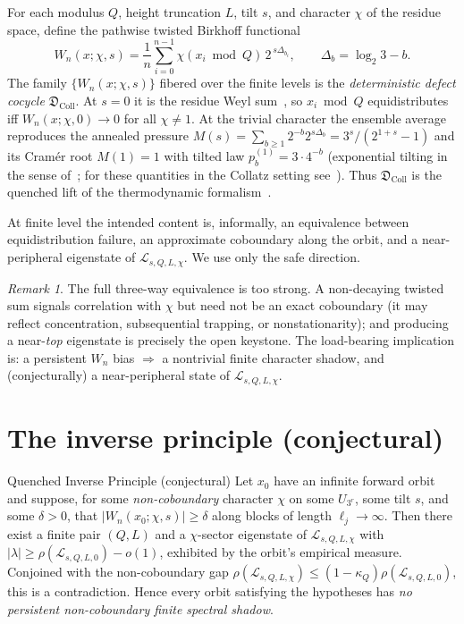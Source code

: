 \documentclass[11pt]{article}
\newcommand{\Lcal}{\mathcal{L}}
\newcommand{\UQ}{U_{3^r}}
\newcommand{\Dcoll}{\mathfrak{D}_{\mathrm{Coll}}}
\theoremstyle{plain}
\theoremstyle{definition}
\theoremstyle{remark}
\newtheorem*{remark}{Remark}
\begin{document}
For each modulus $Q$, height truncation $L$, tilt $s$, and character $\chi$ of
the residue space, define the pathwise twisted Birkhoff functional
\[
W_n(x;\chi,s)=\frac1n\sum_{i=0}^{n-1}\chi(x_i\bmod Q)\,2^{\,s\Delta_{b_i}},
\qquad \Delta_b=\log_2 3-b .
\]
The family $\{W_n(x;\chi,s)\}$ fibered over the finite levels is the
\emph{deterministic defect cocycle} $\Dcoll$. At $s=0$ it is the residue Weyl
sum~\cite{weyl1916}, so $x_i\bmod Q$ equidistributes iff $W_n(x;\chi,0)\to0$ for all $\chi\ne1$.
At the trivial character the ensemble average reproduces the annealed pressure
$M(s)=\sum_{b\ge1}2^{-b}2^{s\Delta_b}=3^s/(2^{1+s}-1)$ and its Cram\'er root
$M(1)=1$ with tilted law $p^{(1)}_b=3\cdot4^{-b}$
(exponential tilting in the sense of~\cite{cramer1938,dembozeitouni}; for these
quantities in the Collatz setting see~\cite{kontorovichlagarias,tao2022}). Thus $\Dcoll$ is the quenched
lift of the thermodynamic formalism~\cite{ruelle2004,baladi2000}.

At finite level the intended content is, informally, an equivalence between
equidistribution failure, an approximate coboundary along the orbit, and a
near-peripheral eigenstate of $\Lcal_{s,Q,L,\chi}$. We use only the safe
direction.

\begin{remark}
The full three-way equivalence is too strong. A non-decaying twisted sum signals
correlation with $\chi$ but need not be an exact coboundary (it may reflect
concentration, subsequential trapping, or nonstationarity); and producing a
near-\emph{top} eigenstate is precisely the open keystone. The load-bearing
implication is: a persistent $W_n$ bias $\Rightarrow$ a nontrivial finite
character shadow, and (conjecturally) a near-peripheral state of
$\Lcal_{s,Q,L,\chi}$.
\end{remark}

\section{The inverse principle (conjectural)}

\begin{principlebox}{Quenched Inverse Principle (conjectural)}
Let $x_0$ have an infinite forward orbit and suppose, for some
\emph{non-coboundary} character $\chi$ on some $\UQ$, some tilt $s$, and some
$\delta>0$, that $\lvert W_n(x_0;\chi,s)\rvert\ge\delta$ along blocks of length
$\ell_j\to\infty$. Then there exist a finite pair $(Q,L)$ and a $\chi$-sector
eigenstate of $\Lcal_{s,Q,L,\chi}$ with $\lvert\lambda\rvert\ge
\rho(\Lcal_{s,Q,L,0})-o(1)$, exhibited by the orbit's empirical measure.
Conjoined with the non-coboundary gap
$\rho(\Lcal_{s,Q,L,\chi})\le(1-\kappa_Q)\rho(\Lcal_{s,Q,L,0})$, this is a
contradiction. Hence every orbit satisfying the hypotheses has \emph{no
persistent non-coboundary finite spectral shadow}.
\end{principlebox}
\end{document}
